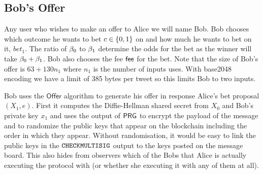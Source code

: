 \documentclass[runningheads]{llncs}
\begin{document}
\subsection{Bob's Offer}

Any user who wishes to make an offer to Alice we will name Bob. Bob chooses which outcome he wants to bet $c \in \{0,1\}$ on and how much he wants to bet on it, $bet_1$. The ratio of $\beta_0$ to $\beta_1$ determine the odds for the bet as the winner will take $\beta_0 + \beta_1$. Bob also chooses the fee $\textsf{fee}$ for the bet. Note that the size of Bob's offer is $63 + 130n_1$ where $n_1$ is the number of inputs uses. With base2048 encoding we have a limit of 385 bytes per tweet so this limits Bob to two inputs.

\begin{center}
\end{center}


Bob uses the $\textsf{Offer}$ algorithm to generate his offer in response Alice's bet proposal $(X_1,e)$. First it computes the Diffie-Hellman shared secret from $X_0$ and Bob's private key $x_1$ and uses the output of $\textsf{PRG}$ to encrypt the payload of the message and to randomize the public keys that appear on the blockchain including the order in which they appear. Without randomisation, it would be easy to link the public keys in the $\texttt{CHECKMULTISIG}$ output to the keys posted on the message board. This also hides from observers which of the Bobs that Alice is actually executing the protocol with (or whether she executing it with any of them at all).
\end{document}
